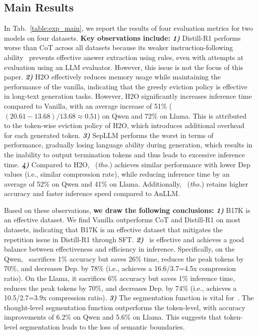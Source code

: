 \subsection{Main Results}
In Tab.~\ref{table:exp_main}, we report the results of four evaluation metrics for two models on four datasets.
\textbf{Key observations include:}
\textbf{\textit{1)}} 
Distill-R1 performs worse than CoT across all datasets because its weaker instruction-following ability~\citep{arxiv25_think_fail} prevents effective answer extraction using rules, even with attempts at evaluation using an LLM evaluator. 
However, this issue is not the focus of this paper.
\textbf{\textit{2)}} H2O effectively reduces memory usage while maintaining the performance of the vanilla, indicating that the greedy eviction policy is effective in long-text generation tasks. 
However, H2O significantly increases inference time compared to Vanilla, with an average increase of 51\% ($(20.61-13.68)/13.68\approx 0.51$) on Qwen and 72\% on Llama. 
This is attributed to the token-wise eviction policy of H2O, which introduces additional overhead for each generated token.
\textbf{\textit{3)}} SepLLM performs the worst in terms of performance, gradually losing language ability during generation, which results in the inability to output termination tokens and thus leads to excessive inference time.
\textbf{\textit{4)}} Compared to H2O, \ours~(\textit{tho.}) achieves similar performance with lower Dep values (i.e., similar compression rate), while reducing inference time by an average of 52\% on Qwen and 41\% on Llama. 
Additionally, \ours~(\textit{tho.}) retains higher accuracy and faster inference speed compared to AnLLM.

Based on these observations, \textbf{we draw the following conclusions:}
\textbf{\textit{1)}} {B17K is an effective dataset.}
We find Vanilla outperforms CoT and Distill-R1 on most datasets, indicating that B17K is an effective dataset that mitigates the repetition issue in Distill-R1 through SFT.
\textbf{\textit{2)}} {\ours~is effective and achieves a good balance between effectiveness and efficiency in inference.}
Specifically, on the Qwen, \ours~sacrifices 1\% accuracy but saves 26\% time, reduces the peak tokens by 70\%, and decreases Dep. by 78\% (i.e., achieves a 16.6/3.7=4.5x compression ratio). 
On the Llama, it sacrifices 6\% accuracy but saves 1\% inference time, reduces the peak tokens by 70\%, and decreases Dep. by 74\% (i.e., achieves a 10.5/2.7=3.9x compression ratio).
\textbf{\textit{3)}} {The segmentation function is vital for~\ours.} %
The thought-level segmentation function outperforms the token-level, with accuracy improvements of 6.2\% on Qwen and 5.6\% on Llama. 
This suggests that token-level segmentation leads to the loss of semantic boundaries.


